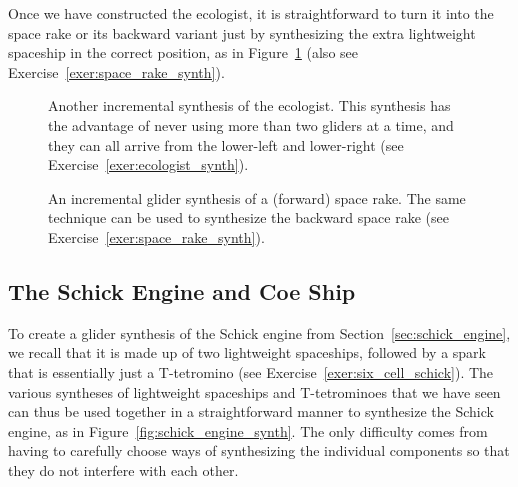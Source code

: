 Once we have constructed the ecologist, it is straightforward to turn it into the space rake or its backward variant just by synthesizing the extra lightweight spaceship in the correct position, as in Figure~\ref{fig:space_rake_synth} (also see Exercise~\ref{exer:space_rake_synth}). %

\begin{figure}[!htb]
	\centering
	\begin{minipage}[b]{0.43\textwidth}
		\centering
		\caption{Another incremental synthesis of the ecologist. This synthesis has the advantage of never using more than two gliders at a time, and they can all arrive from the lower-left and lower-right (see Exercise~\ref{exer:ecologist_synth}).}\label{fig:ecologist_synth_b}
	\end{minipage}\hfill%
	\begin{minipage}[b]{0.53\textwidth}
		\centering
		\caption{An incremental glider synthesis of a (forward) space rake. The same technique can be used to synthesize the backward space rake (see Exercise~\ref{exer:space_rake_synth}).}\label{fig:space_rake_synth}
	\end{minipage}
\end{figure}


\subsection{The Schick Engine and Coe Ship}\label{sec:incremental_schick}

To create a glider synthesis of the Schick engine from Section~\ref{sec:schick_engine}, we recall that it is made up of two lightweight spaceships, followed by a spark that is essentially just a T-tetromino (see Exercise~\ref{exer:six_cell_schick}). The various syntheses of lightweight spaceships and T-tetrominoes that we have seen can thus be used together in a straightforward manner to synthesize the Schick engine, as in Figure~\ref{fig:schick_engine_synth}. The only difficulty comes from having to carefully choose ways of synthesizing the individual components so that they do not interfere with each other.

